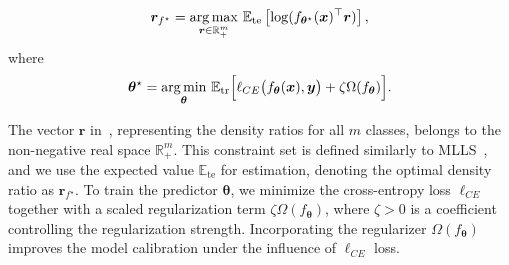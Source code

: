 \begin{equation}\label{eq:f_wo_g}
{\boldsymbol{r}_{f^\star}} = \underset{\boldsymbol{r} \in \mathbb{R}_+^{m}}{\operatorname*{arg\,max}}~ \mathbb{E}_{\text{te}}\left[\log (f_{\boldsymbol{\theta}^\star}(\boldsymbol{x})^\top \boldsymbol{r})\right],
\end{equation} where 
\begin{equation}\label{eq:f_g}
{\boldsymbol{\theta}^\star} = \underset{{\boldsymbol{\theta}}}{\operatorname*{arg\,min}}~\mathbb{E}_{\text{tr}}\Bigl[\ell_{CE}\big(f_{{\boldsymbol{\theta}}}(\boldsymbol{x}),\boldsymbol{y}\big) + \zeta\Omega(f_{{\boldsymbol{\theta}}})\Bigr].
\end{equation}


The vector \( \boldsymbol{r} \) in~, representing the density ratios for all \( m \) classes, belongs to the non-negative real space \( \mathbb{R}_{+}^m \). This constraint set is defined similarly to MLLS~\citep{garg2022OSLS}, and we use the expected value  \( \mathbb{E}_{\text{te}} \) for estimation, denoting the optimal density ratio as \( {\boldsymbol{r}_{f^\star}} \).
To train the predictor $\boldsymbol{\theta}$, we minimize the cross-entropy loss \( \ell_{CE} \) together with a scaled regularization term $\zeta\Omega(f_{{\boldsymbol{\theta}}})$, where $\zeta>0$ is a coefficient controlling the regularization strength.
Incorporating the regularizer $\Omega(f_{{\boldsymbol{\theta}}})$ improves the model calibration under the influence of \( \ell_{CE} \)  loss.
